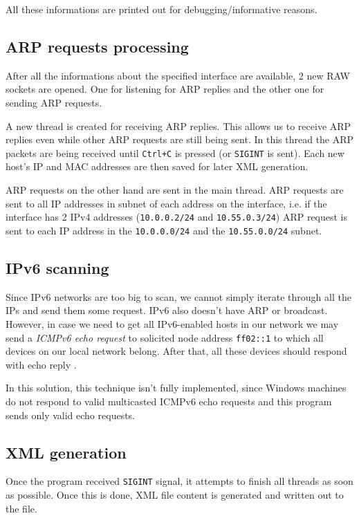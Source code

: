\documentclass[11pt,a4paper]{article}
\begin{document}
		All these informations are printed out for debugging/informative reasons.
	
	\subsection{ARP requests processing}
		After all the informations about the specified interface are available, 2 new RAW sockets are opened. One for listening for ARP replies and the other one for sending ARP requests.
		
		A new thread is created for receiving ARP replies. This allows us to receive ARP replies even while other ARP requests are still being sent. In this thread the ARP packets are being received until \texttt{Ctrl+C} is pressed (or \texttt{SIGINT} is sent). Each new host's IP and MAC addresses are then saved for later XML generation.
		
		ARP requests on the other hand are sent in the main thread. ARP requests are sent to all IP addresses in subnet of each address on the interface, i.e. if the interface has 2 IPv4 addresses (\texttt{10.0.0.2/24} and \texttt{10.55.0.3/24}) ARP request is sent to each IP address in the \texttt{10.0.0.0/24} and  the \texttt{10.55.0.0/24} subnet.
		
	\subsection{IPv6 scanning}
		Since IPv6 networks are too big to scan, we cannot simply iterate through all the IPs and send them some request. IPv6 also doesn't have ARP or broadcast. However, in case we need to get all IPv6-enabled hosts in our network we may send a \emph{ICMPv6 echo request} to solicited node address \texttt{ff02::1} to which all devices on our local network belong. After that, all these devices should respond with echo reply \cite{RFC7707}.
		
		In this solution, this technique isn't fully implemented, since Windows machines do not respond to valid multicasted ICMPv6 echo requests and this program sends only valid echo requests.
		
	\subsection{XML generation}
		Once the program received \texttt{SIGINT} signal, it attempts to finish all threads as soon as possible. Once this is done, XML file content is generated and written out to the file.

\newpage

\end{document}
